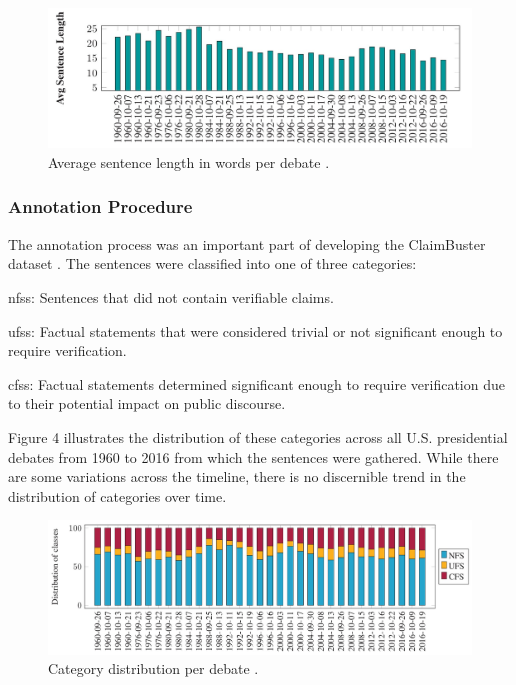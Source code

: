 \begin{figure}[h]
    \centering
    \includegraphics[width=1\textwidth]{assets/Claimbuster_Sentence_Length.jpg}
    \caption{Average sentence length in words per debate \cite{claimbuster_arslan}.}
    \label{fig:my_label}
\end{figure}

\subsubsection{Annotation Procedure}
The annotation process was an important part of developing the ClaimBuster dataset \cite{claimbuster_arslan}. The sentences were classified into one of three categories:

\glspl{nfs}: Sentences that did not contain verifiable claims.

\glspl{ufs}: Factual statements that were considered trivial or not significant enough to require verification.

\glspl{cfs}: Factual statements determined significant enough to require verification due to their potential impact on public discourse.

Figure 4 illustrates the distribution of these categories across all U.S. presidential debates from 1960 to 2016 from which the sentences were gathered. While there are some variations across the timeline, there is no discernible trend in the distribution of categories over time.

\begin{figure}[h]
    \centering
    \includegraphics[width=1\textwidth]{assets/NFS_UFS_CFS.jpg}
    \caption{Category distribution per debate \cite{claimbuster_arslan}.}
    \label{fig:my_label}
\end{figure}

